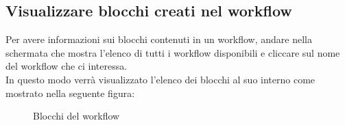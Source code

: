 \subsection{Visualizzare blocchi creati nel workflow}
Per avere informazioni sui blocchi contenuti in un workflow, andare nella schermata che mostra l'elenco di tutti i workflow disponibili  e cliccare sul nome del workflow che ci interessa. \\
In questo modo verrà visualizzato l'elenco dei blocchi al suo interno come mostrato nella seguente figura: \\
\begin{figure}[!ht]
	\centering
	\caption{Blocchi del workflow}
\end{figure}
\newpage

